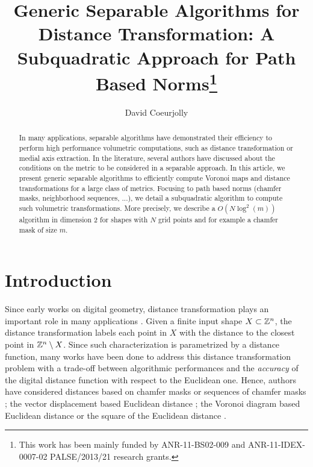 \documentclass{llncs}
\title{Generic Separable Algorithms for Distance Transformation: A
  Subquadratic Approach for Path Based Norms\thanks{This work has been
    mainly funded by ANR-11-BS02-009 and ANR-11-IDEX-0007-02
    PALSE/2013/21 research grants.}}
\author{David Coeurjolly\inst{1}}
\institute{ CNRS,  LIRIS, UMR5205, F-69621, France\\
   \email{david.coeurjolly@liris.cnrs.fr}
}
\begin{document}
\maketitle


\begin{abstract}
In many applications, separable algorithms have demonstrated their
efficiency to perform high performance volumetric computations, such
as distance transformation or medial axis extraction. In the
literature, several authors have discussed about the conditions on the
metric to be considered in a separable approach.  In this article, we
present generic separable algorithms to efficiently compute Voronoi
maps and distance transformations for a large class of
metrics. Focusing to path based norms (chamfer masks, neighborhood
sequences, ...), we detail a subquadratic algorithm to compute such
volumetric transformations. More precisely, we describe a
$O(N\log^2(m))$ algorithm in dimension 2 for shapes with $N$ grid
points and for example a chamfer mask of size $m$.

\end{abstract}

\section{Introduction}
\label{sec:introduction}

Since early works on digital geometry, distance transformation plays
an important role in many applications
\cite{Rosenfeld1966,Rosenfeld1968}. Given a finite input shape
$X\subset {\mathbb{Z}}^n$, the distance transformation labels each point in $X$
with the distance to the closest point in ${\mathbb{Z}}^n \setminus X$. Since
such characterization is parametrized by a distance function, many
works have been done to address this distance transformation problem
with a trade-off between algorithmic performances and the
\emph{accuracy} of the digital distance function with respect to the
Euclidean one.  Hence, authors have considered distances based on
chamfer masks
\cite{Rosenfeld1968,borgefors,Thiel_IWCIA7,fouard:ivc:2005} or
sequences of chamfer masks
\cite{ROSEN_66,mukherjee,Nagy05,Strand2008,DBLP:conf/dgci/NormandSE13};
the vector displacement based Euclidean distance
\cite{danielson,ragnemalm,MULL_92,Cuisenaire1999_268}; the Voronoi
diagram based Euclidean distance
\cite{BreuEtAl95,GotLin95,Guan,maurer_pami} or the square of the
Euclidean distance \cite{SaitTori:94,Hirata,roerdnik}.
\end{document}
